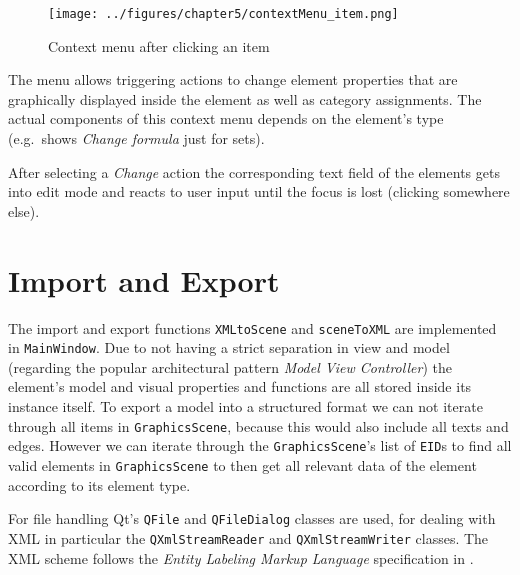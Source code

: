 \documentclass[twoside, openright, 12pt]{book}
\begin{document}

\begin{figure}[htb]
	\centering
	\texttt{[image: ../figures/chapter5/contextMenu\_item.png]}
	\caption{Context menu after clicking an item}
	\label{fig:contextMenu_item}
\end{figure}

\noindent
The menu allows triggering actions to change element properties that are graphically displayed inside the element as well as category assignments.
The actual components of this context menu depends on the element's type (e.g.\ shows \textit{Change formula} just for sets).

After selecting a \textit{Change} action the corresponding text field of the elements gets into edit mode and reacts to user input until the focus is lost (clicking somewhere else).



\section{Import and Export}
\label{implementation_importexport}
The import and export functions \texttt{XMLtoScene} and \texttt{sceneToXML} are implemented in \texttt{MainWindow}.
Due to not having a strict separation in view and model (regarding the popular architectural pattern \textit{Model View Controller}) the element's model and visual properties and functions are all stored inside its instance itself.
To export a model into a structured format we can not iterate through all items in \texttt{GraphicsScene}, because this would also include all texts and edges.
However we can iterate through the \texttt{GraphicsScene}'s list of \texttt{EID}s to find all valid elements in \texttt{GraphicsScene} to then get all relevant data of the element according to its element type.

For file handling Qt's \texttt{QFile} and \texttt{QFileDialog} classes are used, for dealing with XML in particular the \texttt{QXmlStreamReader} and \texttt{QXmlStreamWriter} classes.
The XML scheme follows the \textit{Entity Labeling Markup Language} specification in \cite[appendix C.2, p.~196]{Amthor18}.
\end{document}
